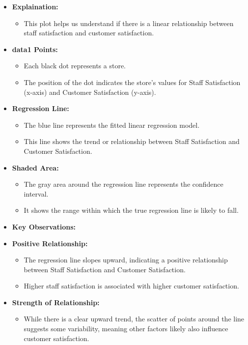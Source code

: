 \documentclass[
]{article}
\providecommand{\tightlist}{%
  \setlength{\itemsep}{0pt}\setlength{\parskip}{0pt}}
\begin{document}
\begin{itemize}
\item
  \textbf{Explaination:}

  \begin{itemize}
  \tightlist
  \item
    This plot helps us understand if there is a linear relationship
    between staff satisfaction and customer satisfaction.
  \end{itemize}
\item
  \textbf{data1 Points:}

  \begin{itemize}
  \tightlist
  \item
    Each black dot represents a store.
  \item
    The position of the dot indicates the store's values for Staff
    Satisfaction (x-axis) and Customer Satisfaction (y-axis).
  \end{itemize}
\item
  \textbf{Regression Line:}

  \begin{itemize}
  \tightlist
  \item
    The blue line represents the fitted linear regression model.
  \item
    This line shows the trend or relationship between Staff Satisfaction
    and Customer Satisfaction.
  \end{itemize}
\item
  \textbf{Shaded Area:}

  \begin{itemize}
  \tightlist
  \item
    The gray area around the regression line represents the confidence
    interval.
  \item
    It shows the range within which the true regression line is likely
    to fall.
  \end{itemize}
\item
  \textbf{Key Observations:}
\item
  \textbf{Positive Relationship:}

  \begin{itemize}
  \tightlist
  \item
    The regression line slopes upward, indicating a positive
    relationship between Staff Satisfaction and Customer Satisfaction.
  \item
    Higher staff satisfaction is associated with higher customer
    satisfaction.
  \end{itemize}
\item
  \textbf{Strength of Relationship:}

  \begin{itemize}
  \tightlist
  \item
    While there is a clear upward trend, the scatter of points around
    the line suggests some variability, meaning other factors likely
    also influence customer satisfaction.
  \end{itemize}
\end{itemize}
\end{document}
